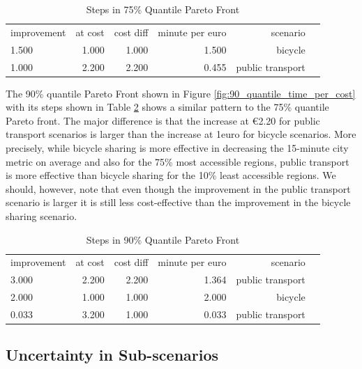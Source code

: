 \begin{table}
  \caption{Steps in 75\% Quantile Pareto Front}
  \label{tab:differences_in_75_quantile_pareto_front}
  \begin{center}
    \begin{tabular}{lrrrrl}
     improvement & at cost & cost diff & minute per euro & scenario \\
     1.500 & 1.000 & 1.000 & 1.500 & bicycle \\
     1.000 & 2.200 & 2.200 & 0.455 & public transport \\
    \end{tabular}
  \end{center}
\end{table}


The 90\% quantile Pareto Front shown in Figure \ref{fig:90_quantile_time_per_cost} with its steps shown in Table \ref{tab:differences_in_90_quantile_pareto_front} shows a similar pattern to the 75\% quantile Pareto front.
The major difference is that the increase at \euro{2.20} for public transport scenarios is larger than the increase at 1euro for bicycle scenarios.
More precisely, while bicycle sharing is more effective in decreasing the 15-minute city metric on average and also for the 75\% most accessible regions, public transport is more effective than bicycle sharing for the 10\% least accessible regions.
We should, however, note that even though the improvement in the public transport scenario is larger it is still less cost-effective than the improvement in the bicycle sharing scenario.


\begin{table}
  \caption{Steps in 90\% Quantile Pareto Front}
  \label{tab:differences_in_90_quantile_pareto_front}
  \begin{center}
    \begin{tabular}{lrrrrl}
     improvement & at cost & cost diff & minute per euro & scenario \\
     3.000 & 2.200 & 2.200 & 1.364 & public transport \\
     2.000 & 1.000 & 1.000 & 2.000 & bicycle \\
     0.033 & 3.200 & 1.000 & 0.033 & public transport \\
    \end{tabular}
  \end{center}
\end{table}


\subsection{Uncertainty in Sub-scenarios}
\label{subsec:uncertainty_subscenarios}

